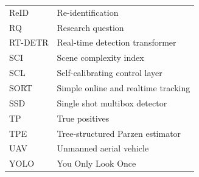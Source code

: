 \begin{longtable}{ll}
ReID & Re-identification \\
RQ & Research question \\
RT-DETR & Real-time detection transformer \\
SCI & Scene complexity index \\
SCL & Self-calibrating control layer \\
SORT & Simple online and realtime tracking \\
SSD & Single shot multibox detector \\
TP & True positives \\
TPE & Tree-structured Parzen estimator \\
UAV & Unmanned aerial vehicle \\
YOLO & You Only Look Once \\
\end{longtable}

